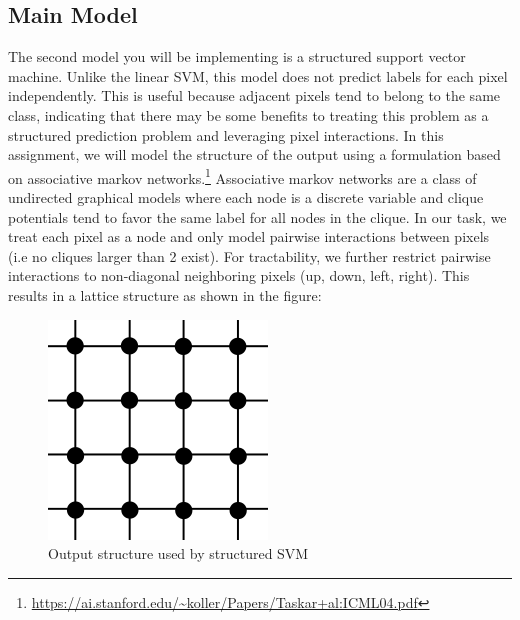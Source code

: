 \documentclass[11pt,addpoints,answers]{exam}
\numberwithin{equation}{section} %
\numberwithin{figure}{section} %
\numberwithin{table}{section} %
\begin{document}
\subsection{Main Model}
The second model you will be implementing is a structured support vector machine. Unlike the linear SVM, this model does not predict labels for each pixel independently. This is useful because adjacent pixels tend to belong to the same class, indicating that there may be some benefits to treating this problem as a structured prediction problem and leveraging pixel interactions. In this assignment, we will model the structure of the output using a formulation based on associative markov networks.\footnote{\url{https://ai.stanford.edu/~koller/Papers/Taskar+al:ICML04.pdf}} Associative markov networks are a class of undirected graphical models where each node is a discrete variable and clique potentials tend to favor the same label for all nodes in the clique. 
In our task, we treat each pixel as a node and only model pairwise interactions between pixels (i.e no cliques larger than 2 exist). For tractability, we further restrict pairwise interactions to non-diagonal neighboring pixels (up, down, left, right). This results in a lattice structure as shown in the figure:
\begin{figure}[h]
    \centering
    \includegraphics[scale=0.5]{figures/lattice.png}
    \caption{Output structure used by structured SVM}
    \label{fig:lattice}
\end{figure}
\end{document}
